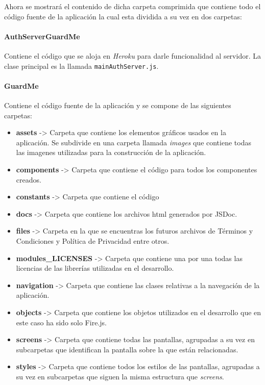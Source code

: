 \documentclass[11pt]{report}
\begin{document}
Ahora se mostrará el contenido de dicha carpeta comprimida que contiene todo el código fuente de la aplicación la cual esta dividida a su vez en dos carpetas:

\paragraph*{AuthServerGuardMe}
Contiene el código que se aloja en \textit{Heroku} para darle funcionalidad al servidor. La clase principal es la llamada \texttt{mainAuthServer.js}.

\paragraph*{GuardMe}
Contiene el código fuente de la aplicación y se compone de las siguientes carpetas:
\begin{itemize}
	\item \textbf{assets} -> Carpeta que contiene los elementos gráficos usados en la aplicación. Se subdivide en una carpeta llamada \textit{images} que contiene todas las imagenes utilizadas para la construcción de la aplicación.
	\item \textbf{components} -> Carpeta que contiene el código para todos los componentes creados.
	\item \textbf{constants} -> Carpeta que contiene el código
	\item \textbf{docs} -> Carpeta que contiene los archivos html generados por JSDoc.
	\item \textbf{files} -> Carpeta en la que se encuentras los futuros archivos de Términos y Condiciones y Política de Privacidad entre otros.
	\item \textbf{modules\_LICENSES} -> Carpeta que contiene una por una todas las licencias de las librerías utilizadas en el desarrollo.
	\item \textbf{navigation} -> Carpeta que contiene las clases relativas a la navegación de la aplicación.
	\item \textbf{objects} -> Carpeta que contiene los objetos utilizados en el desarrollo que en este caso ha sido solo Fire.js.
	\item \textbf{screens} -> Carpeta que contiene todas las pantallas, agrupadas a su vez en subcarpetas que identifican la pantalla sobre la que están relacionadas.
	\item \textbf{styles} -> Carpeta que contiene todos los estilos de las pantallas, agrupadas a su vez en subcarpetas que siguen la misma estructura que \textit{screens}.

\end{itemize}
\end{document}
